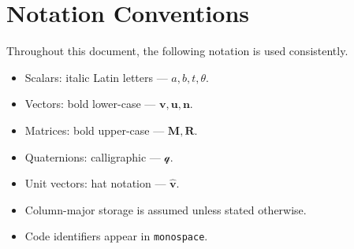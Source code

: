 \section{Notation Conventions}

Throughout this document, the following notation is used consistently.

\begin{itemize}[leftmargin=1.5em]
  \item Scalars: italic Latin letters --- $a, b, t, \theta$.
  \item Vectors: bold lower-case --- $\mathbf{v}, \mathbf{u}, \mathbf{n}$.
  \item Matrices: bold upper-case --- $\mathbf{M}, \mathbf{R}$.
  \item Quaternions: calligraphic --- $\mathcal{q}$.
  \item Unit vectors: hat notation --- $\hat{\mathbf{v}}$.
  \item Column-major storage is assumed unless stated otherwise.
  \item Code identifiers appear in \texttt{monospace}.
\end{itemize}
